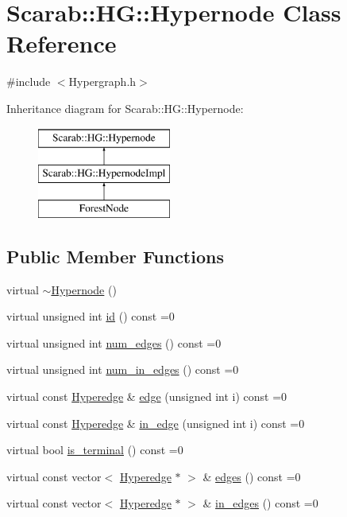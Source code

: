 \hypertarget{class_scarab_1_1_h_g_1_1_hypernode}{
\section{Scarab::HG::Hypernode Class Reference}
\label{class_scarab_1_1_h_g_1_1_hypernode}
}


{\ttfamily \#include $<$Hypergraph.h$>$}

Inheritance diagram for Scarab::HG::Hypernode:\begin{figure}[H]
\begin{center}
\leavevmode
\includegraphics[height=3cm]{class_scarab_1_1_h_g_1_1_hypernode}
\end{center}
\end{figure}
\subsection*{Public Member Functions}
\begin{DoxyCompactItemize}
\item 
virtual \hyperlink{class_scarab_1_1_h_g_1_1_hypernode_a0657cc96f62d29da3ae4b5b9bcab1ce6}{$\sim$Hypernode} ()
\item 
virtual unsigned int \hyperlink{class_scarab_1_1_h_g_1_1_hypernode_a0aeaee6c2ca2a011fcd086f803aaa4d0}{id} () const =0
\item 
virtual unsigned int \hyperlink{class_scarab_1_1_h_g_1_1_hypernode_add2f4d556be223b906bfbab9f1b60870}{num\_\-edges} () const =0
\item 
virtual unsigned int \hyperlink{class_scarab_1_1_h_g_1_1_hypernode_a4b1a4ffaa8a8b0295763673e6d86d693}{num\_\-in\_\-edges} () const =0
\item 
virtual const \hyperlink{class_scarab_1_1_h_g_1_1_hyperedge}{Hyperedge} \& \hyperlink{class_scarab_1_1_h_g_1_1_hypernode_a3bface6832eb54a00d90e4fe8d1999f7}{edge} (unsigned int i) const =0
\item 
virtual const \hyperlink{class_scarab_1_1_h_g_1_1_hyperedge}{Hyperedge} \& \hyperlink{class_scarab_1_1_h_g_1_1_hypernode_a533d3e0bc2269ec07edbda32305daf70}{in\_\-edge} (unsigned int i) const =0
\item 
virtual bool \hyperlink{class_scarab_1_1_h_g_1_1_hypernode_ae3e1107309a8817d1015bd70a90c1c49}{is\_\-terminal} () const =0
\item 
virtual const vector$<$ \hyperlink{class_scarab_1_1_h_g_1_1_hyperedge}{Hyperedge} $\ast$ $>$ \& \hyperlink{class_scarab_1_1_h_g_1_1_hypernode_a3306572ded5b5061c1916bcf268be94e}{edges} () const =0
\item 
virtual const vector$<$ \hyperlink{class_scarab_1_1_h_g_1_1_hyperedge}{Hyperedge} $\ast$ $>$ \& \hyperlink{class_scarab_1_1_h_g_1_1_hypernode_aad118748408663b8242dc52d45bbd49d}{in\_\-edges} () const =0
\end{DoxyCompactItemize}


